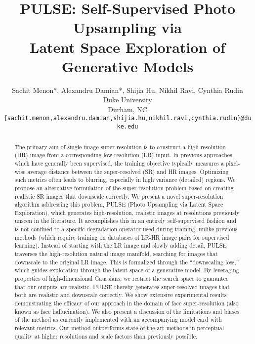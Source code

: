 \documentclass[10pt,twocolumn,letterpaper]{article}
\begin{document}
\title{PULSE: Self-Supervised Photo Upsampling via \\Latent Space Exploration of Generative Models}

\author{Sachit Menon*, Alexandru Damian*, Shijia Hu, Nikhil Ravi, Cynthia Rudin\\
Duke University\\
Durham, NC\\
{\tt\small \{sachit.menon,alexandru.damian,shijia.hu,nikhil.ravi,cynthia.rudin\}@duke.edu}
}

\maketitle


\begin{abstract}
The primary aim of single-image super-resolution is to construct a high-resolution (HR) image from a corresponding low-resolution (LR) input. In previous approaches, which have generally been supervised, the training objective typically measures a pixel-wise average distance between the super-resolved (SR) and HR images. Optimizing such metrics often leads to blurring, especially in high variance (detailed) regions. We propose an alternative formulation of the super-resolution problem based on creating realistic SR images that downscale correctly. We present a novel super-resolution algorithm addressing this problem, PULSE (Photo Upsampling via Latent Space Exploration), which generates high-resolution, realistic images at resolutions previously unseen in the literature. It accomplishes this in an entirely self-supervised fashion and is not confined to a specific degradation operator used during training, unlike previous methods (which require training on databases of LR-HR image pairs for supervised learning). Instead of starting with the LR image and slowly adding detail, PULSE traverses the high-resolution natural image manifold, searching for images that downscale to the original LR image. This is formalized through the ``downscaling loss,'' which guides exploration through the latent space of a generative model. By leveraging properties of high-dimensional Gaussians, we restrict the search space to guarantee that our outputs are realistic. PULSE thereby generates super-resolved images that both are realistic and downscale correctly. We show extensive experimental results demonstrating the efficacy of our approach in the domain of face super-resolution (also known as face hallucination). We also present a discussion of the limitations and biases of the method as currently implemented with an accompanying model card with relevant metrics. Our method outperforms state-of-the-art methods in perceptual quality at higher resolutions and scale factors than previously possible. 
\end{abstract}
\end{document}
